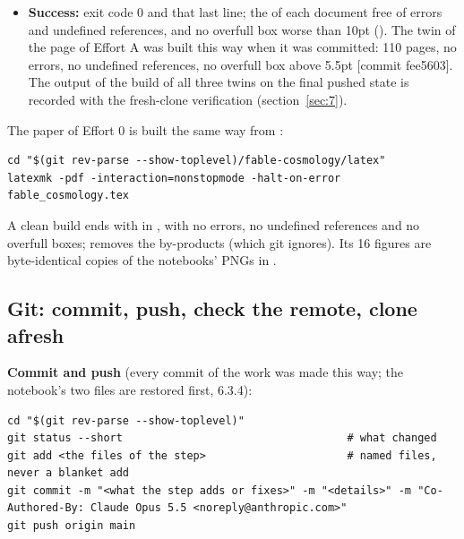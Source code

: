 \begin{itemize}
  \item \textbf{Success:} exit code 0 and that last line; the  of each document free of errors and undefined references, and no overfull box worse than 10pt (). The twin of the page of Effort A was built this way when it was committed: 110 pages, no errors, no undefined references, no overfull box above 5.5pt [commit fee5603]. The output of the build of all three twins on the final pushed state is recorded with the fresh-clone verification (section~\ref{sec:7}).
\end{itemize}

The paper of Effort 0 is built the same way from :

\begin{Verbatim}
cd "$(git rev-parse --show-toplevel)/fable-cosmology/latex"
latexmk -pdf -interaction=nonstopmode -halt-on-error fable_cosmology.tex
\end{Verbatim}

A clean build ends with  in , with no errors, no undefined references and no overfull boxes;  removes the by-products (which git ignores). Its 16 figures are byte-identical copies of the notebooks' PNGs in .

\subsection{Git: commit, push, check the remote, clone afresh}
\label{sec:6.10}

\textbf{Commit and push} (every commit of the work was made this way; the notebook's two  files are restored first, 6.3.4):

\begin{Verbatim}
cd "$(git rev-parse --show-toplevel)"
git status --short                                   # what changed
git add <the files of the step>                      # named files, never a blanket add
git commit -m "<what the step adds or fixes>" -m "<details>" -m "Co-Authored-By: Claude Opus 5.5 <noreply@anthropic.com>"
git push origin main
\end{Verbatim}

